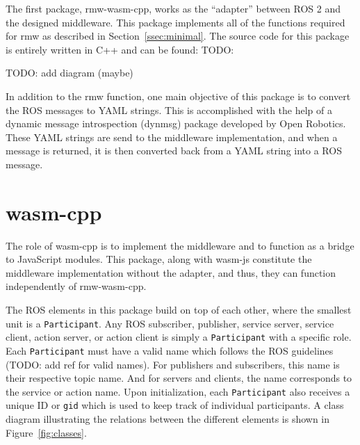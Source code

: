         The first package, \textsf{rmw-wasm-cpp}, works as the ``adapter'' between \ac{ROS} 2 and the designed middleware. This package implements all of the functions required for \textsf{rmw} as described in Section~\ref{ssec:minimal}. The source code for this package is entirely written in C++ and can be found: TODO: 

        TODO: add diagram (maybe)

        In addition to the \textsf{rmw} function, one main objective of this package is to convert the \ac{ROS} messages to \ac{YAML} strings. This is accomplished with the help of a dynamic message introspection (\textsf{dynmsg}) package developed by Open Robotics. These \ac{YAML} strings are send to the middleware implementation, and when a message is returned, it is then converted back from a \ac{YAML} string into a ROS message. 

    \section{wasm-cpp}

        The role of \textsf{wasm-cpp} is to implement the middleware and to function as a bridge to JavaScript modules. This package, along with \textsf{wasm-js} constitute the middleware implementation without the adapter, and thus, they can function independently of \textsf{rmw-wasm-cpp}. 

        The \ac{ROS} elements in this package build on top of each other, where the smallest unit is a \texttt{Participant}. Any \ac{ROS} subscriber, publisher, service server, service client, action server, or action client is simply a \texttt{Participant} with a specific role. Each \texttt{Participant} must have a valid name which follows the \ac{ROS} guidelines (TODO: add ref for valid names). For publishers and subscribers, this name is their respective topic name. And for servers and clients, the name corresponds to the service or action name.  Upon initialization, each \texttt{Participant} also receives a unique ID or \texttt{gid} which is used to keep track of individual participants. A class diagram illustrating the relations between the different elements is shown in Figure~\ref{fig:classes}.

